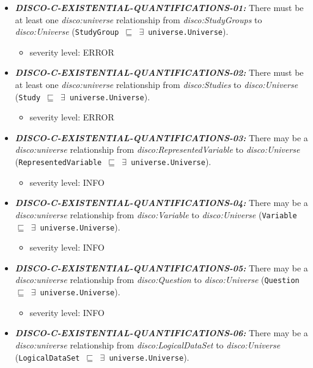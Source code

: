 \documentclass{llncs}
\newcommand{\ms}[1]{\texttt{#1}}
\begin{document}
\begin{itemize}
	\item \textbf{{\em DISCO-C-EXISTENTIAL-QUANTIFICATIONS-01:}} 
There must be at least one {\em disco:universe} relationship from {\em disco:StudyGroups} to {\em disco:Universe} (\ms{StudyGroup $\sqsubseteq$ $\exists$ universe.Universe}).
	\begin{itemize}
		\item severity level: ERROR
	\end{itemize}
	\item \textbf{{\em DISCO-C-EXISTENTIAL-QUANTIFICATIONS-02:}} 
There must be at least one {\em disco:universe} relationship from {\em disco:Studies} to {\em disco:Universe} (\ms{Study $\sqsubseteq$ $\exists$ universe.Universe}).
	\begin{itemize}
		\item severity level: ERROR
	\end{itemize}
	\item \textbf{{\em DISCO-C-EXISTENTIAL-QUANTIFICATIONS-03:}} 
There may be a {\em disco:universe} relationship from {\em disco:RepresentedVariable} to {\em disco:Universe} (\ms{RepresentedVariable $\sqsubseteq$ $\exists$ universe.Universe}).
	\begin{itemize}
		\item severity level: INFO
	\end{itemize}
	\item \textbf{{\em DISCO-C-EXISTENTIAL-QUANTIFICATIONS-04:}} 
There may be a {\em disco:universe} relationship from {\em disco:Variable} to {\em disco:Universe} (\ms{Variable $\sqsubseteq$ $\exists$ universe.Universe}).
	\begin{itemize}
		\item severity level: INFO
	\end{itemize}
	\item \textbf{{\em DISCO-C-EXISTENTIAL-QUANTIFICATIONS-05:}} 
There may be a {\em disco:universe} relationship from {\em disco:Question} to {\em disco:Universe} (\ms{Question $\sqsubseteq$ $\exists$ universe.Universe}).
	\begin{itemize}
		\item severity level: INFO
	\end{itemize}
	\item \textbf{{\em DISCO-C-EXISTENTIAL-QUANTIFICATIONS-06:}} 
There may be a {\em disco:universe} relationship from {\em disco:LogicalDataSet} to {\em disco:Universe} (\ms{LogicalDataSet $\sqsubseteq$ $\exists$ universe.Universe}).
	\begin{itemize}

\end{itemize}
\end{itemize}
\end{document}
